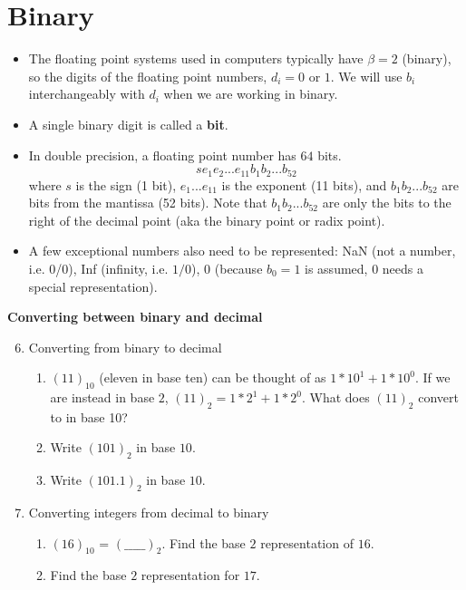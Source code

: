 \documentclass[12pt,letterpaper,noanswers]{exam}
\begin{document}
\section{Binary}



\begin{tcolorbox}
\begin{itemize}
\itemsep0pt
    \item The floating point systems used in computers typically have $\beta = 2$ (binary), so the digits of the floating point numbers, $d_i = 0$ or $1$.  We will use $b_i$ interchangeably with $d_i$ when we are working in binary.
    \item A single binary digit is called a \textbf{bit}.
    \item In double precision, a floating point number has $64$ bits.  \[s e_1e_2...e_{11}b_1b_2...b_{52}\] where $s$ is the sign (1 bit), $e_1...e_{11}$ is the exponent (11 bits), and $b_1b_2...b_{52}$ are bits from the mantissa (52 bits).  Note that $b_1b_2...b_{52}$ are only the bits to the right of the decimal point (aka the binary point or radix point).
    \item A few exceptional numbers also need to be represented: NaN (not a number, i.e. 0/0), Inf (infinity, i.e. $1/0$), 0 (because $b_0 = 1$ is assumed, $0$ needs a special representation).  
\end{itemize}
\end{tcolorbox}




\noindent\textbf{Converting between binary and decimal}

\begin{enumerate}
\setcounter{enumi}{5}
    \item Converting from binary to decimal \begin{enumerate}
        \item $(11)_{10}$ (eleven in base ten) can be thought of as $1*10^1+1*10^0$.  If we are instead in base $2$, $(11)_2 = 1*2^1+1*2^0$. What does $(11)_2$ convert to in base 10?
        \item Write $(101)_2$ in base $10$.
        \item Write $(101.1)_2$ in base $10$.
    \end{enumerate}
    \item Converting integers from decimal to binary
    \begin{enumerate}
        \item $(16)_{10}$ = $(\_ \_ \_ \_ \_)_2$.  Find the base $2$ representation of $16$.
        \item Find the base $2$ representation for $17$.
    \end{enumerate}
\end{enumerate}
\end{document}
